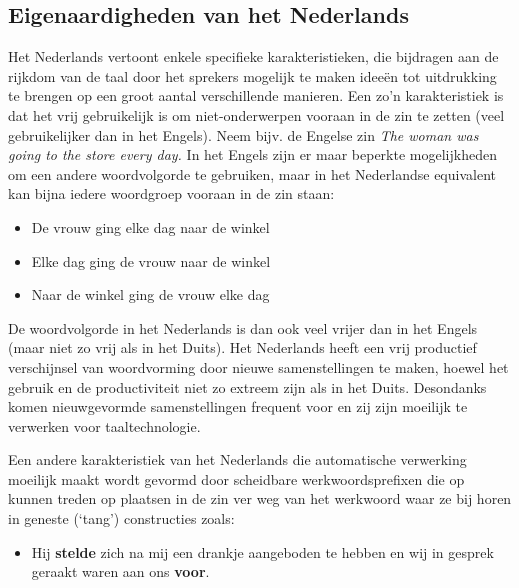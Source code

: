 \documentclass[]{../../metanetpaper}
\begin{document}
\begin{multicols}{2}
\subsection{Eigenaardigheden van het Nederlands}

Het Nederlands vertoont enkele specifieke karakteristieken, die bijdragen aan de rijkdom van de taal door het sprekers mogelijk te maken idee{\"e}n tot uitdrukking te brengen op een groot aantal verschillende manieren. Een zo'n karakteristiek is dat het vrij gebruikelijk is om niet-onderwerpen vooraan in de zin te zetten (veel gebruikelijker dan in het Engels). Neem bijv. de Engelse zin \textit{The woman was going to the store every day.} In het Engels zijn er maar beperkte mogelijkheden om een andere woordvolgorde te gebruiken, maar in het Nederlandse equivalent kan bijna iedere woordgroep vooraan in de zin staan:


\begin{itemize}
\item De vrouw ging elke dag naar de winkel
\item    Elke dag ging de vrouw naar de winkel
\item    Naar de winkel ging de vrouw elke dag
\end{itemize}



    De woordvolgorde in het Nederlands is dan ook veel vrijer dan in het Engels (maar niet zo vrij als in het Duits).
    Het Nederlands heeft een vrij productief verschijnsel van woordvorming door nieuwe samenstellingen te maken, hoewel het gebruik en de productiviteit niet zo extreem zijn als in het Duits. Desondanks komen nieuwgevormde samenstellingen frequent voor en zij zijn moeilijk te verwerken voor taaltechnologie.



    Een andere karakteristiek van het Nederlands die automatische verwerking moeilijk maakt wordt gevormd door scheidbare werkwoordsprefixen die op kunnen treden op plaatsen in de zin ver weg van het werkwoord waar ze bij horen in geneste (`tang') constructies zoals:

\begin{itemize}
\item Hij \textbf{stelde} zich na mij een drankje aangeboden te hebben en wij in gesprek geraakt waren aan ons \textbf{voor}.
\end{itemize}


\end{multicols}
\end{document}
